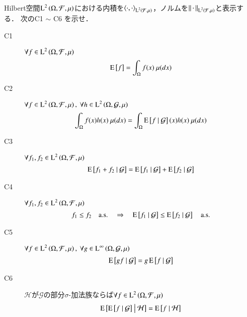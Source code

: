 	\begin{qst}\mbox{}\\
		Hilbert空間$\operatorname{L}^{2} \left(\Omega, \mathcal{F},\mu\right)$における内積を$\inprod<\cdot,\cdot>_{\Lp{2}{\mathcal{F},\mu}}$，ノルムを$\left\|\, \cdot\, \right\|_{\operatorname{L}^{2} \left(\mathcal{F},\mu\right)}$と表示する．
		次のC1 $\sim$ C6 を示せ．
		\begin{description}
			\item[C1] $\forall f \in \operatorname{L}^{2} \left(\Omega, \mathcal{F},\mu\right)$
				\begin{align}
					\operatorname{E} \left[ f \right] = \int_{\Omega} f(x)\ \mu(dx)
				\end{align}
				
			\item[C2]	$\forall f \in \operatorname{L}^{2} \left(\Omega, \mathcal{F},\mu\right),\ \forall h \in \operatorname{L}^{2} \left(\Omega, \mathcal{G},\mu\right)$
				\begin{align}
					\int_{\Omega} f(x)h(x)\ \mu(dx) = \int_{\Omega} \operatorname{E} \left[ f \ \middle|\ \mathcal{G} \right](x)h(x)\ \mu(dx)
				\end{align}
				
			\item[C3]	$\forall f_1,f_2 \in \operatorname{L}^{2} \left(\Omega, \mathcal{F},\mu\right)$
				\begin{align}
					\operatorname{E} \left[ f_1 + f_2 \ \middle|\ \mathcal{G} \right] = \operatorname{E} \left[ f_1 \ \middle|\ \mathcal{G} \right] + \operatorname{E} \left[ f_2 \ \middle|\ \mathcal{G} \right]
				\end{align}

			\item[C4]	$\forall f_1,f_2 \in \operatorname{L}^{2} \left(\Omega, \mathcal{F},\mu\right)$
				\begin{align}
					f_1 \leq f_2 \quad \mathrm{a.s.} \quad \Rightarrow \quad \operatorname{E} \left[ f_1 \ \middle|\ \mathcal{G} \right] \leq \operatorname{E} \left[ f_2 \ \middle|\ \mathcal{G} \right] \quad \mathrm{a.s.}
				\end{align}
			
			\item[C5]	$\forall f \in \operatorname{L}^{2} \left(\Omega, \mathcal{F},\mu\right),\ \forall g \in \operatorname{L}^{\infty} \left(\Omega, \mathcal{G},\mu\right)$
				\begin{align}
					\operatorname{E} \left[ gf \ \middle|\ \mathcal{G} \right] = g\operatorname{E} \left[ f \ \middle|\ \mathcal{G} \right]
				\end{align}
			
			\item[C6]	$\mathcal{H}$が$\mathcal{G}$の部分$\sigma$-加法族ならば$\forall f \in \operatorname{L}^{2} \left(\Omega, \mathcal{F},\mu\right)$
				\begin{align}
					\operatorname{E} \left[ \operatorname{E} \left[ f \ \middle|\ \mathcal{G} \right] \ \middle|\ \mathcal{H} \right] = \operatorname{E} \left[ f \ \middle|\ \mathcal{H} \right]
				\end{align}
		\end{description}
	\end{qst}
	
